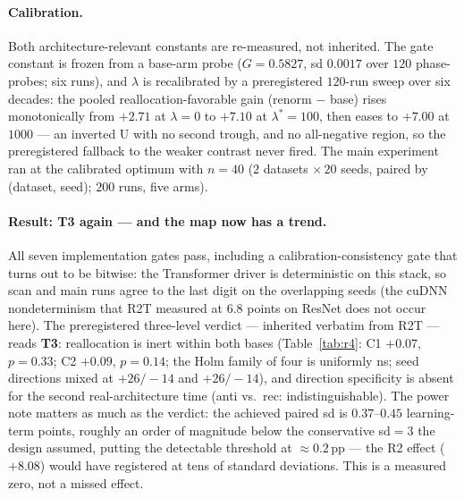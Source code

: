 \documentclass[10pt]{article}
\begin{document}
\paragraph{Calibration.} Both architecture-relevant constants are
re-measured, not inherited. The gate constant is frozen from a base-arm
probe ($G=0.5827$, sd $0.0017$ over $120$ phase-probes; six runs), and
$\lambda$ is recalibrated by a preregistered $120$-run sweep over six
decades: the pooled reallocation-favorable gain (renorm $-$ base) rises
monotonically from $+2.71$ at $\lambda{=}0$ to $+7.10$ at
$\lambda^{*}{=}100$, then eases to $+7.00$ at $1000$ --- an inverted U
with no second trough, and no all-negative region, so the preregistered
fallback to the weaker contrast never fired. The main experiment ran at
the calibrated optimum with $n{=}40$ ($2$ datasets $\times\,20$ seeds,
paired by (dataset, seed); $200$ runs, five arms).

\paragraph{Result: T3 again --- and the map now has a trend.} All seven
implementation gates pass, including a calibration-consistency gate that
turns out to be bitwise: the Transformer driver is deterministic on this
stack, so scan and main runs agree to the last digit on the overlapping
seeds (the cuDNN nondeterminism that R2T measured at $6.8$ points on
ResNet does not occur here). The preregistered three-level verdict ---
inherited verbatim from R2T --- reads \textbf{T3}: reallocation is inert
within both bases (Table~\ref{tab:r4}: C1 $+0.07$, $p{=}0.33$; C2
$+0.09$, $p{=}0.14$; the Holm family of four is uniformly ns; seed
directions mixed at $+26/-14$ and $+26/-14$), and direction specificity is
absent for the second real-architecture time (anti vs.\ rec:
indistinguishable). The power note matters as much as the verdict: the
achieved paired sd is $0.37$--$0.45$ learning-term points, roughly an
order of magnitude below the conservative sd$=3$ the design assumed,
putting the detectable threshold at $\approx 0.2$\,pp --- the R2 effect
($+8.08$) would have registered at tens of standard deviations. This is a
measured zero, not a missed effect.
\end{document}
